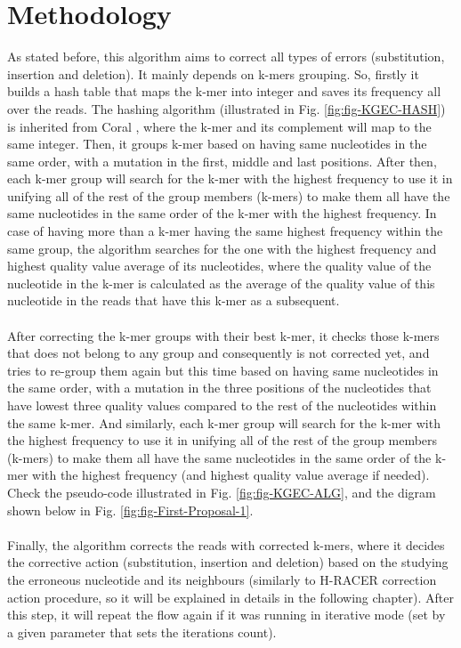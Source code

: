 \documentclass[12pt,openany]{llncs}
\begin{document}
\section{\label{sec:alg1-meth}Methodology}
As stated before, this algorithm aims to correct all types of errors (substitution, insertion and deletion). It mainly depends on k-mers grouping. So, firstly it builds a hash table that maps the k-mer into integer and saves its frequency all over the reads. The hashing algorithm (illustrated in Fig. \ref{fig:fig-KGEC-HASH}) is inherited from Coral \cite{Coral}, where the k-mer and its complement will map to the same integer. Then, it groups k-mer based on having same nucleotides in the same order, with a mutation in the first, middle and last positions. After then, each k-mer group will search for the k-mer with the highest frequency to use it in unifying all of the rest of the group members (k-mers) to make them all have the same nucleotides in the same order of the k-mer with the highest frequency. In case of having more than a k-mer having the same highest frequency within the same group, the algorithm searches for the one with the highest frequency and highest quality value average of its nucleotides, where the quality value of the nucleotide in the k-mer is calculated as the average of the quality value of this nucleotide in the reads that have this k-mer as a subsequent. 
\\
\\
After correcting the k-mer groups with their best k-mer, it checks those k-mers that does not belong to any group and consequently is not corrected yet, and tries to re-group them again but this time based on having same nucleotides in the same order, with a mutation in the three positions of the nucleotides that have lowest three quality values compared to the rest of the nucleotides within the same k-mer. And similarly, each k-mer group will search for the k-mer with the highest frequency to use it in unifying all of the rest of the group members (k-mers) to make them all have the same nucleotides in the same order of the k-mer with the highest frequency (and highest quality value average if needed). 
\\
Check the pseudo-code illustrated in Fig. \ref{fig:fig-KGEC-ALG}, and the digram shown below in Fig. \ref{fig:fig-First-Proposal-1}.
\\
\\
Finally, the algorithm corrects the reads with corrected k-mers, where it decides the corrective action (substitution, insertion and deletion) based on the studying the erroneous nucleotide and its neighbours (similarly to H-RACER correction action procedure, so it will be explained in details in the following chapter). After this step, it will repeat the flow again if it was running in iterative mode (set by a given parameter that sets the iterations count).
\end{document}
